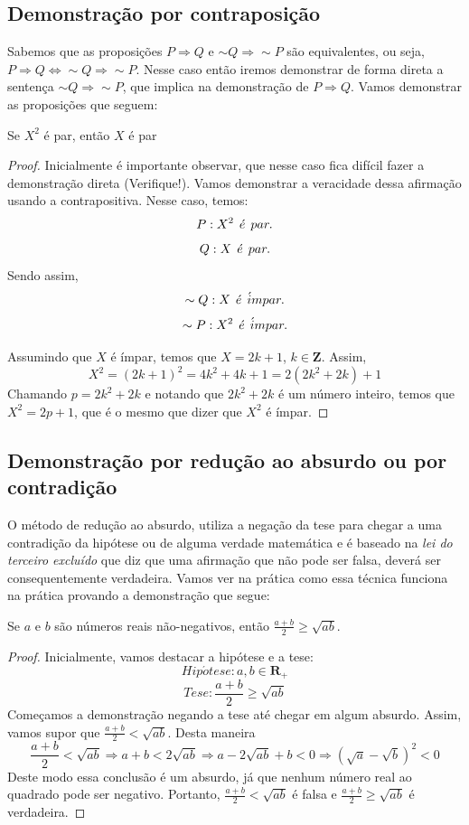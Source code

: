 \subsection{Demonstração por contraposição}
Sabemos que as proposições $P \Rightarrow Q$ e $\sim Q \Rightarrow \sim P$ são equivalentes, ou seja, $P \Rightarrow Q \Leftrightarrow \sim Q \Rightarrow \sim P$. Nesse caso então iremos demonstrar de forma direta a sentença $\sim Q \Rightarrow \sim P$, que implica na demonstração de $P \Rightarrow Q$. Vamos demonstrar as proposições que seguem:
\begin{prop}
Se $X^2$ é par, então $X$ é par
\end{prop}
\begin{proof}
Inicialmente é importante observar, que nesse caso fica difícil fazer a demonstração direta (Verifique!). Vamos demonstrar a veracidade dessa afirmação usando a contrapositiva. Nesse caso, temos:
$$P : X^2 \hspace{0.15cm} \acute{e} \hspace{0.15cm} par. $$
$$ Q: X \hspace{0.15cm}  \acute{e} \hspace{0.15cm} par.$$
Sendo assim,
$$ \sim Q: X \hspace{0.15cm}  \acute{e} \hspace{0.15cm} \acute{i}mpar.$$
$$ \sim P : X^2 \hspace{0.15cm}  \acute{e} \hspace{0.15cm} \acute{i}mpar. $$

Assumindo que $X$ é ímpar, temos que $X=2k+1$, $k \in \mathbf{Z}$. Assim,
$$X^2=(2k+1)^2=4k^2+4k+1=2(2k^2+2k)+1$$
Chamando $p=2k^2+2k$ e notando que $2k^2+2k$ é um número inteiro, temos que $X^2=2p+1$, que é o mesmo que dizer que $X^2$ é ímpar.
\end{proof}
\subsection{Demonstração por redução ao absurdo ou por contradição}
O método de redução ao absurdo, utiliza a negação da tese para chegar a uma contradição da hipótese ou de alguma verdade matemática e é baseado na \textit{lei do terceiro excluído} que diz que uma afirmação que não pode ser falsa, deverá ser consequentemente verdadeira. Vamos ver na prática como essa técnica funciona na prática provando a demonstração que segue:
\begin{prop}
Se $a$ e $b$ são números reais não-negativos, então $\frac{a+b}{2} \geq \sqrt{ab}$.
\end{prop}
\begin{proof}
Inicialmente, vamos destacar a hipótese e a tese:
$$Hip\acute{o}tese: a,b \in \mathbf{R}_{+}$$
$$Tese: \frac{a+b}{2} \geq \sqrt{ab}$$
Começamos a demonstração negando a tese até chegar em algum absurdo. Assim, vamos supor que $\frac{a+b}{2} < \sqrt{ab}$. Desta maneira
$$\frac{a+b}{2} < \sqrt{ab} \Rightarrow a+b < 2 \sqrt{ab} \Rightarrow a-2\sqrt{ab}+b <0 \Rightarrow (\sqrt{a}-\sqrt{b})^2 <0$$
Deste modo essa conclusão é um absurdo, já que nenhum número real ao quadrado pode ser negativo. Portanto, $\frac{a+b}{2} < \sqrt{ab}$ é falsa e $\frac{a+b}{2} \geq \sqrt{ab}$ é verdadeira.
\end{proof}

